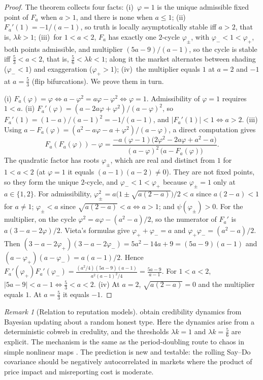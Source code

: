 \documentclass{article}
\theoremstyle{plain}
\theoremstyle{definition}
\theoremstyle{remark}
\newtheorem{remark}[theorem]{Remark}
\begin{document}
\thmcycles*
\begin{proof}
The theorem collects four facts: (i)~$\varphi=1$ is the unique admissible fixed point of $F_a$ when $a>1$, and there is none when $a\le1$; (ii)~$F_a'(1)=-1/(a-1)$, so truth is locally asymptotically stable iff $a>2$, that is, $\lambda k>1$; (iii)~for $1<a<2$, $F_a$ has exactly one $2$-cycle $\varphi_\pm$, with $\varphi_-<1<\varphi_+$, both points admissible, and multiplier $(5a-9)/(a-1)$, so the cycle is stable iff $\tfrac53<a<2$, that is, $\tfrac56<\lambda k<1$; along it the market alternates between shading ($\varphi_-<1$) and exaggeration ($\varphi_+>1$); (iv)~the multiplier equals $1$ at $a=2$ and $-1$ at $a=\tfrac53$ (flip bifurcations). We prove them in turn.

(i) $F_a(\varphi)=\varphi\iff a-\varphi^2=a\varphi-\varphi^2\iff\varphi=1$. Admissibility of $\varphi=1$ requires $1<a$.
(ii) $F_a'(\varphi)=(a-2a\varphi+\varphi^2)/(a-\varphi)^2$, so $F_a'(1)=(1-a)/(a-1)^2=-1/(a-1)$, and $|F_a'(1)|<1\iff a>2$.
(iii) Using $a-F_a(\varphi)=(a^2-a\varphi-a+\varphi^2)/(a-\varphi)$, a direct computation gives
\[
  F_a(F_a(\varphi))-\varphi=\frac{-a(\varphi-1)\big(2\varphi^2-2a\varphi+a^2-a\big)}{(a-\varphi)^2\,\big(a-F_a(\varphi)\big)} .
\]
The quadratic factor has roots $\varphi_\pm$, which are real and distinct from $1$ for $1<a<2$ (at $\varphi=1$ it equals $(a-1)(a-2)\neq0$). They are not fixed points, so they form the unique $2$-cycle, and $\varphi_-<1<\varphi_+$ because $\varphi_\pm=1$ only at $a\in\{1,2\}$. For admissibility, $\varphi_\pm^2=a\big(1\pm\sqrt{a(2-a)}\big)/2<a$ since $a(2-a)<1$ for $a\neq1$; $\varphi_\pm<a$ since $\sqrt{a(2-a)}<a\iff a>1$; and $\psi(\varphi_\pm)>0$.
For the multiplier, on the cycle $\varphi^2=a\varphi-(a^2-a)/2$, so the numerator of $F_a'$ is $a(3-a-2\varphi)/2$. Vieta's formulas give $\varphi_++\varphi_-=a$ and $\varphi_+\varphi_-=(a^2-a)/2$. Then $(3-a-2\varphi_+)(3-a-2\varphi_-)=5a^2-14a+9=(5a-9)(a-1)$ and $(a-\varphi_+)(a-\varphi_-)=a(a-1)/2$. Hence $F_a'(\varphi_+)F_a'(\varphi_-)=\frac{(a^2/4)(5a-9)(a-1)}{a^2(a-1)^2/4}=\frac{5a-9}{a-1}$. For $1<a<2$, $|5a-9|<a-1\iff\tfrac53<a<2$.
(iv) At $a=2$, $\sqrt{a(2-a)}=0$ and the multiplier equals $1$. At $a=\tfrac53$ it equals $-1$.
\end{proof}

\begin{remark}[Relation to reputation models]
\citet{benabou1992} obtain credibility dynamics from Bayesian updating about a random honest type. Here the dynamics arise from a deterministic cobweb in credulity, and the thresholds $\lambda k=1$ and $\lambda k=\tfrac56$ are explicit. The mechanism is the same as the period-doubling route to chaos in simple nonlinear maps \citep{may1976}. The prediction is new and testable: the rolling Say--Do covariance should be negatively autocorrelated in markets where the product of price impact and misreporting cost is moderate.
\end{remark}
\end{document}
